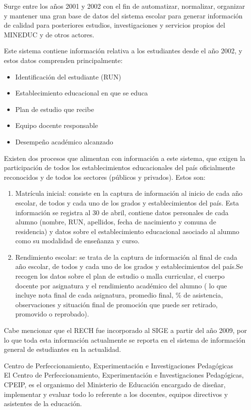\begin{longdescription}
    Surge entre los años 2001 y 2002 con el fin de automatizar, normalizar, organizar y mantener una gran base de datos del sistema escolar para generar información de calidad para posteriores estudios, investigaciones y servicios propios del MINEDUC y de otros actores.
    
    Este sistema contiene información relativa a los estudiantes desde el año 2002, y estos datos comprenden principalmente: 
    \begin{itemize}
        \item Identificación del estudiante (RUN)
        \item Establecimiento educacional en que se educa
        \item Plan de estudio que recibe
        \item Equipo docente responsable
        \item Desempeño académico alcanzado
    \end{itemize}
    Existen dos procesos que alimentan con información a este sistema, que exigen la participación de todos los establecimientos educacionales del país oficialmente reconocidos y de todos los sectores (públicos y privados). Estos son:
    \begin{enumerate}
        \item Matrícula inicial: consiste en la captura de información al inicio de cada año escolar, de todos y cada uno de los grados y establecimientos del país. Esta información se registra al 30 de abril, contiene datos personales de cada alumno (nombre, RUN, apellidos, fecha de nacimiento y comuna de residencia) y datos sobre el establecimiento educacional asociado al alumno como su modalidad de enseñanza y curso.
        \item Rendimiento escolar: se trata de la captura de información al final de cada año escolar, de todos y cada uno de los grados y establecimientos del país.Se recogen los datos sobre el plan de estudio o malla curricular, el cuerpo docente por asignatura y el rendimiento académico del alumno ( lo que incluye nota final de cada asignatura, promedio final, \% de asistencia, observaciones y situación final de promoción que puede ser retirado, promovido o reprobado).
    \end{enumerate}
    Cabe mencionar que el RECH fue incorporado al SIGE a partir del año 2009, por lo que toda esta información actualmente se reporta en el sistema de información general de estudiantes en la actualidad. 
\item [Centro de Perfeccionamiento, Experimentación e Investigaciones Pedagógicas] \hfill \\
    El Centro de Perfeccionamiento, Experimentación e Investigaciones Pedagógicas, CPEIP, es el organismo del Ministerio de Educación encargado de diseñar, implementar y evaluar todo lo referente a los docentes, equipos directivos y asistentes de la educación.
    

\end{longdescription}
